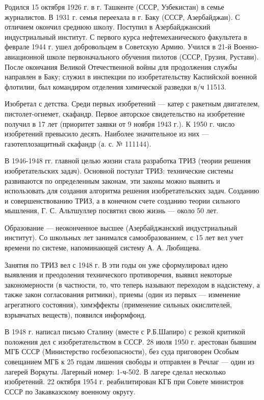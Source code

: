 Родился 15  октября 1926 г. в  г. Ташкенте (СССР, Узбекистан)  в семье
журналистов. В 1931 г. семья  переехала в г. Баку (СССР, Азербайджан).
С  отличием   окончил  среднюю   школу.  Поступил   в  Азербайджанский
индустриальный институт. С первого курса нефтемеханического факультета
в  феврале  1944  г.  ушел  добровольцем  в  Советскую  Армию.  Учился
в  21-й  Военно-авиационной  школе  первоначального  обучения  пилотов
(СССР, Грузия,  Рустави). После окончания Великой  Отечественной войны
для  продолжения  службы  направлен  в Баку;  служил  в  инспекции  по
изобретательству Каспийской военной флотилии, был командиром отделения
химической разведки в/ч 11513.

Изобретал  с детства.  Среди  первых изобретений  —  катер с  ракетным
двигателем, пистолет-огнемет, скафандр. Первое авторское свидетельство
на  изобретение  получил  в  17  лет (приоритет  заявки  от  9  ноября
1943  г.). К  1950  г. число  изобретений  превысило десять.  Наиболее
значительное из них — газотеплозащитный скафандр (а. с. № 111144).

В  1946-1948 гг.  главной целью  жизни стала  разработка ТРИЗ  (теории
решения изобретательских  задач). Основной постулат  ТРИЗ: технические
системы развиваются по определенным  законам, эти законы можно выявить
и использовать для создания  алгоритма решения изобретательских задач.
Созданию и совершенствованию ТРИЗ, а  в конечном счете созданию теории
сильного мышления,  Г. С.  Альтшуллер посвятил свою  жизнь —  около 50
лет.

Образование  —  неоконченное  высшее  (Азербайджанский  индустриальный
институт). Со  школьных лет занимался  самообразованием, с 15  лет вел
учет времени по системе, напоминающей систему А. А. Любищева.

Занятия по  ТРИЗ вел с  1948 г. В эти  годы он уже  сформулировал идею
выявления  и преодоления  технического противоречия,  выявил некоторые
закономерности  (в  частности, то,  что  теперь  называют переходом  в
надсистему,  а  также закон  согласования  ритмики),  приемы (один  из
первых  —  изменение  агрегатного состояния),  химэффекты  (применение
сильных окислителей, взрывчатых веществ), появился информфонд.

В  1948 г.  написал  письмо  Сталину (вместе  с  Р.Б.Шапиро) с  резкой
критикой положения  дел с  изобретательством в СССР.  28 июля  1950 г.
арестован  бывшим МГБ  СССР (Министерство  госбезопасности), без  суда
приговорен  Особым  совещанием  МГБ  к  25  годам  лишения  свободы  и
отправлен  в  Речлаг  —  один  из  лагерей  Воркуты.  Лагерный  номер:
1-ч-502. В  лагере сделал  несколько изобретений.  22 октября  1954 г.
реабилитирован КГБ при Совете министров СССР по Закавказскому военному
округу.

